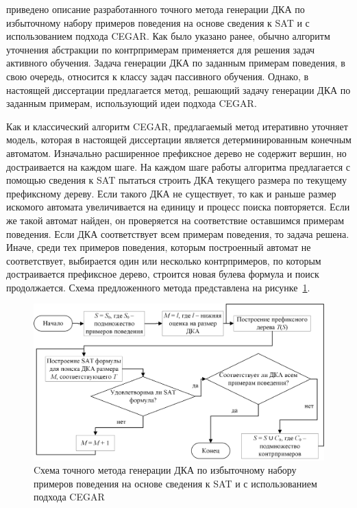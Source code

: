 \insection{\ref{sec:cegar:cegar-algo}} приведено описание разработанного точного метода генерации ДКА по избыточному набору примеров поведения на основе сведения к SAT и с использованием подхода CEGAR. 
Как было указано ранее, обычно алгоритм уточнения абстракции по контрпримерам применяется для решения задач активного обучения. 
Задача генерации ДКА по заданным примерам поведения, в свою очередь, относится к классу задач пассивного обучения.
Однако, в настоящей диссертации предлагается метод, решающий задачу генерации ДКА по заданным примерам, использующий идеи подхода CEGAR.

Как и классический алгоритм CEGAR, предлагаемый метод итеративно уточняет модель, которая в настоящей диссертации является детерминированным конечным автоматом.
Изначально расширенное префиксное дерево не содержит вершин, но достраивается на каждом шаге.
На каждом шаге работы алгоритма предлагается с помощью сведения к SAT пытаться строить ДКА текущего размера по текущему префиксному дереву.
Если такого ДКА не существует, то как и раньше размер искомого автомата увеличивается на единицу и процесс поиска повторяется.
Если же такой автомат найден, он проверяется на соответствие оставшимся примерам поведения.
Если ДКА соответствует всем примерам поведения, то задача решена.
Иначе, среди тех примеров поведения, которым построенный автомат не соответствует, выбирается один или несколько контрпримеров, по которым достраивается префиксное дерево, строится новая булева формула и поиск продолжается.
Схема предложенного метода представлена на рисунке~\ref{syn:img:cegar-algo}.

\begin{figure}[ht]
  \centering
  \includegraphics[scale=0.5]{img/ntv/cegar.jpg}
  \caption{Cхема точного метода генерации ДКА по избыточному набору примеров поведения на основе сведения к SAT и с использованием подхода CEGAR}
  \label{syn:img:cegar-algo}
\end{figure}

